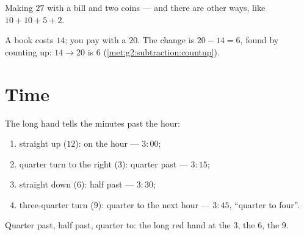 \begin{omfigure}

{\small Making $27$ with a bill and two coins --- and there are other
ways, like $10 + 10 + 5 + 2$.}
\end{omfigure}

\begin{example}[Change]\label{ex:g2:measure:change}
A book costs $14$; you pay with a $20$. The change is $20 - 14 =
6$, found by counting up: $14 \to 20$ is $6$
(\cref{met:g2:subtraction:countup}).
\end{example}

\section{Time}

\begin{method}\label{met:g2:measure:clock}
The long hand tells the minutes past the hour:
\begin{enumerate}
  \item straight up ($12$): on the hour --- $3{:}00$;
  \item quarter turn to the right ($3$): quarter past --- $3{:}15$;
  \item straight down ($6$): half past --- $3{:}30$;
  \item three-quarter turn ($9$): quarter to the next hour ---
        $3{:}45$, ``quarter to four''.
\end{enumerate}
\end{method}

\begin{omfigure}

{\small Quarter past, half past, quarter to: the long red hand at
the $3$, the $6$, the $9$.}
\end{omfigure}

